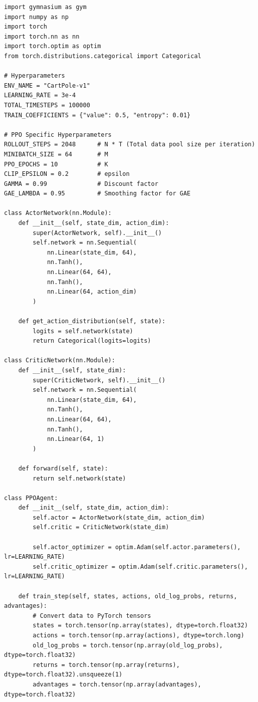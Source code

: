 \documentclass[12pt,a4paper]{article}
\theoremstyle{noteplain}
\theoremstyle{noteexercise}
\begin{document}
\begin{lstlisting}[caption={PPO 算法 PyTorch 实现}, label={lst:ppo}]
import gymnasium as gym
import numpy as np
import torch
import torch.nn as nn
import torch.optim as optim
from torch.distributions.categorical import Categorical

# Hyperparameters
ENV_NAME = "CartPole-v1"
LEARNING_RATE = 3e-4
TOTAL_TIMESTEPS = 100000
TRAIN_COEFFICIENTS = {"value": 0.5, "entropy": 0.01}

# PPO Specific Hyperparameters
ROLLOUT_STEPS = 2048      # N * T (Total data pool size per iteration)
MINIBATCH_SIZE = 64       # M
PPO_EPOCHS = 10           # K
CLIP_EPSILON = 0.2        # epsilon
GAMMA = 0.99              # Discount factor
GAE_LAMBDA = 0.95         # Smoothing factor for GAE

class ActorNetwork(nn.Module):
    def __init__(self, state_dim, action_dim):
        super(ActorNetwork, self).__init__()
        self.network = nn.Sequential(
            nn.Linear(state_dim, 64),
            nn.Tanh(),
            nn.Linear(64, 64),
            nn.Tanh(),
            nn.Linear(64, action_dim)
        )
        
    def get_action_distribution(self, state):
        logits = self.network(state)
        return Categorical(logits=logits)

class CriticNetwork(nn.Module):
    def __init__(self, state_dim):
        super(CriticNetwork, self).__init__()
        self.network = nn.Sequential(
            nn.Linear(state_dim, 64),
            nn.Tanh(),
            nn.Linear(64, 64),
            nn.Tanh(),
            nn.Linear(64, 1)
        )
        
    def forward(self, state):
        return self.network(state)

class PPOAgent:
    def __init__(self, state_dim, action_dim):
        self.actor = ActorNetwork(state_dim, action_dim)
        self.critic = CriticNetwork(state_dim)
        
        self.actor_optimizer = optim.Adam(self.actor.parameters(), lr=LEARNING_RATE)
        self.critic_optimizer = optim.Adam(self.critic.parameters(), lr=LEARNING_RATE)

    def train_step(self, states, actions, old_log_probs, returns, advantages):
        # Convert data to PyTorch tensors
        states = torch.tensor(np.array(states), dtype=torch.float32)
        actions = torch.tensor(np.array(actions), dtype=torch.long)
        old_log_probs = torch.tensor(np.array(old_log_probs), dtype=torch.float32)
        returns = torch.tensor(np.array(returns), dtype=torch.float32).unsqueeze(1)
        advantages = torch.tensor(np.array(advantages), dtype=torch.float32)
        

\end{lstlisting}
\end{document}
